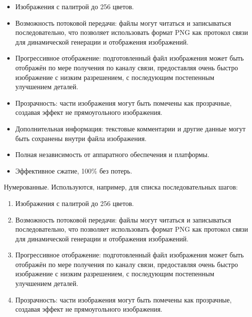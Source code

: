 \documentclass[a4paper,12pt]{report}
\begin{document}
\begin{itemize}
    \item
        Изображения с палитрой до 256 цветов.
        
    \item
        Возможность потоковой передачи:
        файлы могут читаться и записываться последовательно, что позволяет использовать формат
        PNG как протокол связи для динамической генерации и отображения изображений.

    \item
        Прогрессивное отображение: подготовленный файл изображения может быть
        отображён по мере получения по каналу связи,
        предоставляя очень быстро изображение с низким разрешением,
        с последующим постепенным улучшением деталей.

    \item
        Прозрачность: части изображения могут быть помечены как прозрачные,
        создавая эффект не прямоугольного изображения.

    \item 
        Дополнительная информация: текстовые комментарии и другие данные могут быть
        сохранены внутри файла изображения.

    \item
        Полная независимость от аппаратного обеспечения и платформы.

    \item
        Эффективное сжатие, 100\% без потерь.
\end{itemize}

Нумерованные. Используются, например, для списка последовательных шагов:

\begin{enumerate}
    \item 
        Изображения с палитрой до 256 цветов.
    \item 
        Возможность потоковой передачи:
        файлы могут читаться и записываться последовательно, что позволяет использовать формат
        PNG как протокол связи для динамической генерации и отображения изображений.
    \item 
        Прогрессивное отображение: подготовленный файл изображения может быть
        отображён по мере получения по каналу связи,
        предоставляя очень быстро изображение с низким разрешением,
        с последующим постепенным улучшением деталей.
    \item 
        Прозрачность: части изображения могут быть помечены как прозрачные,
        создавая эффект не прямоугольного изображения.
\end{enumerate}
\end{document}
